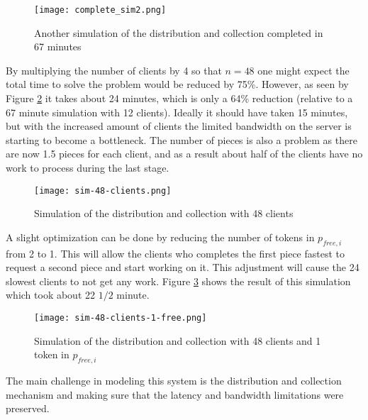 \begin{figure}[htbp]
	\centering 
	\texttt{[image: complete\_sim2.png]}
	\caption{Another simulation of the distribution and collection completed in 67 minutes}
	\label{fig:complete_sim2}
\end{figure}

By multiplying the number of clients by 4 so that $n = 48$ one might expect the total time to solve the problem would be reduced by 75\%.
However, as seen by Figure \ref{fig:sim-48clients} it takes about 24 minutes, which is only a 64\% reduction (relative to a 67 minute simulation with 12 clients).
Ideally it should have taken 15 minutes, but with the increased amount of clients the limited bandwidth on the server is starting to become a bottleneck.
The number of pieces is also a problem as there are now 1.5 pieces for each client, and as a result about half of the clients have no work to process during the last stage.

\begin{figure}[tbp]
	\centering 
	\texttt{[image: sim-48-clients.png]}
	\caption{Simulation of the distribution and collection with 48 clients}
	\label{fig:sim-48clients}
\end{figure}

A slight optimization can be done by reducing the number of tokens in $p_{free,i}$ from 2 to 1.
This will allow the clients who completes the first piece fastest to request a second piece and start working on it.
This adjustment will cause the 24 slowest clients to not get any work.
Figure \ref{fig:sim-48clients-1free} shows the result of this simulation which took about 22 $1/2$ minute.

\begin{figure}[tbp]
	\centering 
	\texttt{[image: sim-48-clients-1-free.png]}
	\caption{Simulation of the distribution and collection with 48 clients and 1 token in $p_{free,i}$}
	\label{fig:sim-48clients-1free}
\end{figure}


The main challenge in modeling this system is the distribution and collection mechanism and making sure that the latency and bandwidth limitations were preserved.




